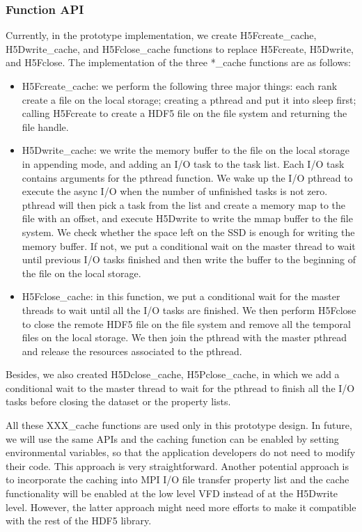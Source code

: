 \documentclass[aps, rmp, 11pt, notitlepage]{revtex4-1}
\begin{document}
\subsubsection{Function API}
Currently, in the prototype implementation, we create H5Fcreate\_cache, H5Dwrite\_cache, and H5Fclose\_cache functions to replace H5Fcreate, H5Dwrite, and H5Fclose. The implementation of the three *\_cache functions are as follows: 
\begin{itemize}
\item H5Fcreate\_cache: we perform the following three major things: each rank create a file on the local storage; creating a pthread and put it into sleep first; calling H5Fcreate to create a HDF5 file on the file system and returning the file handle. 
\item H5Dwrite\_cache: we write the memory buffer to the file on the local storage in appending mode, and adding an I/O task to the task list. Each I/O task contains arguments for the pthread function. We wake up the I/O pthread to execute the async I/O when the number of unfinished tasks is not zero. pthread will then pick a task from the list and create a memory map to the file with an offset, and execute H5Dwrite to write the mmap buffer to the file system. We check whether the space left on the SSD is enough for writing the memory buffer. If not, we put a conditional wait on the master thread to wait until previous I/O tasks finished and then write the buffer to the beginning of the file on the local storage. 
\item H5Fclose\_cache: in this function, we put a conditional wait for the master threads to wait until all the I/O tasks are finished. We then perform H5Fclose to close the remote HDF5 file on the file system and remove all the temporal files on the local storage. We then join the pthread with the master pthread and release the resources associated to the pthread. 
\end{itemize}
Besides, we also created H5Dclose\_cache, H5Pclose\_cache, in which we add a conditional wait to the master thread to wait for the pthread to finish all the I/O tasks before closing the dataset or the property lists. 

All these XXX\_cache functions are used only in this prototype design. In future, we will use the same APIs and the caching function can be enabled by setting environmental variables, so that the application developers do not need to modify their code. This approach is very straightforward. Another potential approach is to incorporate the caching into MPI I/O file transfer property list and the cache functionality will be enabled at the low level VFD instead of at the H5Dwrite level. However, the latter approach might need more efforts to make it compatible with the rest of the HDF5 library. 
\end{document}
